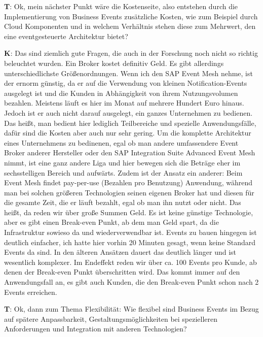 \begin{list}{X:}{\setlength{\labelsep}{5mm}}
 \item[\textbf{T}:] Ok, mein nächster Punkt wäre die Kostenseite, also entstehen durch die Implementierung von Business Events zusätzliche Kosten, wie zum Beispiel durch Cloud Komponenten und in welchem Verhältnis stehen diese zum Mehrwert, den eine eventgesteuerte Architektur bietet?
 \item[\textbf{K}:] Das sind ziemlich gute Fragen, die auch in der Forschung noch nicht so richtig beleuchtet wurden. Ein Broker kostet definitiv Geld. Es gibt allerdings unterschiedlichste Grö{\ss}enordnungen. Wenn ich den SAP Event Mesh nehme, ist der ernorm günstig, da er auf die Verwendung von kleinen Notification-Events ausgelegt ist und die Kunden in Abhängigkeit von ihrem Nutzungsvolumen bezahlen. Meistens läuft es hier im Monat auf mehrere Hundert Euro hinaus. Jedoch ist er auch nicht darauf ausgelegt, ein ganzes Unternehmen zu bedienen. Das hei{\ss}t, man bedient hier lediglich Teilbereiche und spezielle Anwendungsfälle, dafür sind die Kosten aber auch nur sehr gering. Um die komplette Architektur eines Unternehmens zu bedinenen, egal ob man andere umfassendere Event Broker anderer Hersteller oder den SAP Integration Suite Advanced Event Mesh nimmt, ist eine ganz andere Liga und hier bewegen sich die Beträge eher im sechsstelligen Bereich und aufwärts. Zudem ist der Ansatz ein anderer: Beim Event Mesh findet pay-per-use (Bezahlen pro Benutzung) Anwendung, während man bei solchen grö{\ss}eren Technologien seinen eigenen Broker hat und diesen für die gesamte Zeit, die er läuft bezahlt, egal ob man ihn nutzt oder nicht. Das hei{\ss}t, da reden wir über gro{\ss}e Summen Geld. Es ist keine günstige Technologie, aber es gibt einen Break-even Punkt, ab dem man Geld spart, da die Infrastruktur sowieso da und wiederverwendbar ist. Events zu bauen hingegen ist deutlich einfacher, ich hatte hier vorhin 20 Minuten gesagt, wenn keine Standard Events da sind. In den älteren Ansätzen dauert das deutlich länger und ist wesentlich komplexer. Im Endeffekt reden wir über ca. 100 Events pro Kunde, ab denen der Break-even Punkt überschritten wird. Das kommt immer auf den Anwendungsfall an, es gibt auch Kunden, die den Break-even Punkt schon nach 2 Events erreichen.
 \item[\textbf{T}:] Ok, dann zum Thema Flexibilität: Wie flexibel sind Business Events im Bezug auf spätere Anpassbarkeit, Gestaltungsmöglichkeiten bei spezielleren Anforderungen und Integration mit anderen Technologien?

\end{list}
